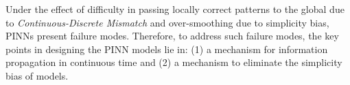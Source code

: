Under the effect of difficulty in passing locally correct patterns to the global due to \textit{Continuous-Discrete Mismatch} and over-smoothing due to simplicity bias, PINNs present failure modes. Therefore, to address such failure modes, the key points in designing the PINN models lie in: (1) a mechanism for information propagation in continuous time and (2) a mechanism to eliminate the simplicity bias of models.

